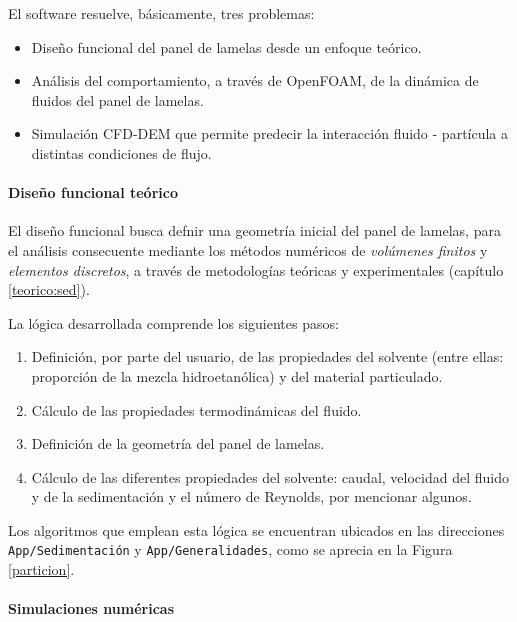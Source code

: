 \noindent
\justify

El software resuelve, b\'asicamente, tres problemas:

\begin{itemize}
	\item Dise\~no funcional del panel de lamelas desde un enfoque te\'orico.
	\item An\'alisis del comportamiento, a trav\'es de OpenFOAM, de la din\'amica de fluidos del panel de lamelas.
	\item Simulaci\'on CFD-DEM que permite predecir la interacci\'on fluido - part\'icula a distintas condiciones de flujo.
\end{itemize}

\paragraph{Dise\~no funcional te\'orico}

\noindent
\justify

El dise\~no funcional busca defnir una geometr\'ia inicial del panel de lamelas, para el an\'alisis consecuente mediante los m\'etodos num\'ericos de \textit{vol\'umenes finitos} y \textit{elementos discretos}, a trav\'es de metodolog\'ias te\'oricas y experimentales (cap\'itulo \ref{teorico:sed}).

\noindent
\justify

La l\'ogica desarrollada comprende los siguientes pasos:

\begin{enumerate}
	\item Definici\'on, por parte del usuario, de las propiedades del solvente (entre ellas: proporci\'on de la mezcla hidroetan\'olica) y del material particulado.
	\item C\'alculo de las propiedades termodin\'amicas del fluido.
	\item Definici\'on de la geometr\'ia del panel de lamelas.
	\item C\'alculo de las diferentes propiedades del solvente: caudal, velocidad del fluido y de la sedimentaci\'on y el n\'umero de Reynolds, por mencionar algunos.
\end{enumerate}

\noindent
\justify

Los algoritmos que emplean esta l\'ogica se encuentran ubicados en las direcciones \texttt{App/Sedimentaci\'on} y \texttt{App/Generalidades}, como se aprecia en la Figura \ref{particion}.

\paragraph{Simulaciones num\'ericas} \label{imp:CFD}

